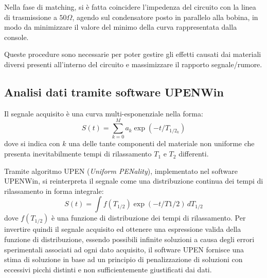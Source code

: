 Nella fase di matching, si è fatta coincidere l'impedenza del circuito con la linea di trasmissione a $50\si{\Omega}$, agendo sul condensatore posto in parallelo alla bobina, in modo da minimizzare il valore del minimo della curva rappresentata dalla console.

Queste procedure sono necessarie per poter gestire gli effetti causati dai materiali diversi presenti all'interno del circuito e massimizzare il rapporto segnale/rumore.

\subsection*{Analisi dati tramite software UPENWin}

Il segnale acquisito è una curva multi-esponenziale nella forma:
\begin{equation}
	S(t) = \sum_{k=0}^M a_k \exp(-t/T_{1/2_k})
\end{equation}
dove si indica con $k$ una delle tante componenti del materiale non uniforme che presenta inevitabilmente tempi di rilassamento $T_1$ e $T_2$ differenti.

Tramite algoritmo UPEN (\textit{Uniform PENality}), implementato nel software UPENWin, si reinterpreta il segnale come una distribuzione continua dei tempi di rilassamento in forma integrale:
\begin{equation}
	S(t) = \int f(T_{1/2}) \exp(-t/T{1/2}) \, dT_{1/2}
\end{equation}
dove $f(T_{1/2})$ è una funzione di distribuzione dei tempi di rilassamento. Per invertire quindi il segnale acquisito ed ottenere una espressione valida della funzione di distribuzione, essendo possibili infinite soluzioni a causa degli errori sperimentali associati ad ogni dato acquisito, il software UPEN fornisce una stima di soluzione in base ad un principio di penalizzazione di soluzioni con eccessivi picchi distinti e non sufficientemente giustificati dai dati.